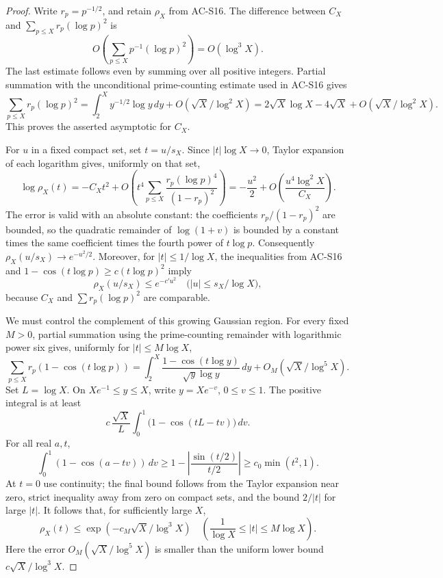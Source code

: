 \begin{proof}
Write \(r_p=p^{-1/2}\), and retain \(\rho_X\) from AC-S16.
The difference between \(C_X\) and
\(\sum_{p\leq X}r_p(\log p)^2\) is
\[
 O\!\left(\sum_{p\leq X}p^{-1}(\log p)^2\right)
       =O(\log^3X).
\]
The last estimate follows even by summing over all positive integers.
Partial summation with the unconditional prime-counting estimate
used in AC-S16 gives
\[
 \sum_{p\leq X}r_p(\log p)^2
  =\int_2^X y^{-1/2}\log y\,dy
           +O(\sqrt X/\log^2X)
  =2\sqrt X\log X-4\sqrt X+O(\sqrt X/\log^2X).
\]
This proves the asserted asymptotic for \(C_X\).

For \(u\) in a fixed compact set, set \(t=u/s_X\).
Since \(|t|\log X\to0\), Taylor expansion of each logarithm gives,
uniformly on that set,
\[
 \log\rho_X(t)
  =-C_Xt^2+
     O\!\left(t^4\sum_{p\leq X}
                \frac{r_p(\log p)^4}{(1-r_p)^2}\right)
  =-\frac{u^2}{2}
       +O\!\left(\frac{u^4\log^2X}{C_X}\right).
\]
The error is valid with an absolute constant: the coefficients
\(r_p/(1-r_p)^2\) are bounded, so the quadratic remainder of
\(\log(1+v)\) is bounded by a constant times the same coefficient
times the fourth power of \(t\log p\).
Consequently \(\rho_X(u/s_X)\to e^{-u^2/2}\).
Moreover, for \(|t|\leq1/\log X\), the inequalities from AC-S16
and \(1-\cos(t\log p)\geq c(t\log p)^2\) imply
\[
 \rho_X(u/s_X)\leq e^{-c'u^2}
       \quad\bigl(|u|\leq s_X/\log X\bigr),
 \tag{SF.1}
\]
because \(C_X\) and \(\sum r_p(\log p)^2\) are comparable.

We must control the complement of this growing Gaussian region.
For every fixed \(M>0\), partial summation using the prime-counting
remainder with logarithmic power six gives, uniformly for
\(|t|\leq M\log X\),
\[
 \sum_{p\leq X}r_p(1-\cos(t\log p))
 =\int_2^X
       \frac{1-\cos(t\log y)}{\sqrt y\log y}\,dy
       +O_M(\sqrt X/\log^5X).
\]
Set \(L=\log X\).  On \(Xe^{-1}\leq y\leq X\), write
\(y=Xe^{-v}\), \(0\leq v\leq1\).  The positive integral is at least
\[
 c\,\frac{\sqrt X}{L}
       \int_0^1\bigl(1-\cos(tL-tv)\bigr)\,dv.
\]
For all real \(a,t\),
\[
 \int_0^1(1-\cos(a-tv))\,dv
 \geq1-\left|\frac{\sin(t/2)}{t/2}\right|
 \geq c_0\min(t^2,1).
\]
At \(t=0\) use continuity; the final bound follows from the
Taylor expansion near zero, strict inequality away from zero on
compact sets, and the bound \(2/|t|\) for large \(|t|\).
It follows that, for sufficiently large \(X\),
\[
 \rho_X(t)\leq
       \exp(-c_M\sqrt X/\log^3X)
 \quad\left(\frac1{\log X}\leq |t|\leq M\log X\right).
 \tag{SF.2}
\]
Here the error \(O_M(\sqrt X/\log^5X)\) is smaller than the
uniform lower bound \(c\sqrt X/\log^3X\).


\end{proof}

